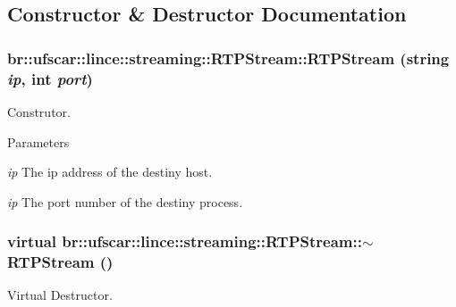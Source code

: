 \subsection{Constructor \& Destructor Documentation}
\hypertarget{classbr_1_1ufscar_1_1lince_1_1streaming_1_1RTPStream_a4fd180622cabd00d28e45cfb80e61284}{
\subsubsection[{RTPStream}]{\setlength{\rightskip}{0pt plus 5cm}br::ufscar::lince::streaming::RTPStream::RTPStream (string {\em ip}, \/  int {\em port})}}
\label{classbr_1_1ufscar_1_1lince_1_1streaming_1_1RTPStream_a4fd180622cabd00d28e45cfb80e61284}


Construtor. 


\begin{DoxyParams}{Parameters}
\item[{\em ip}]The ip address of the destiny host. \item[{\em ip}]The port number of the destiny process. \end{DoxyParams}
\hypertarget{classbr_1_1ufscar_1_1lince_1_1streaming_1_1RTPStream_a3d9df009764249b82871d234bd6573c7}{
\subsubsection[{$\sim$RTPStream}]{\setlength{\rightskip}{0pt plus 5cm}virtual br::ufscar::lince::streaming::RTPStream::$\sim$RTPStream ()}}
\label{classbr_1_1ufscar_1_1lince_1_1streaming_1_1RTPStream_a3d9df009764249b82871d234bd6573c7}


Virtual Destructor. 




